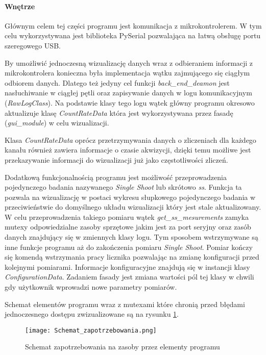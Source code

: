 \paragraph{Wnętrze}

Głównym celem tej części programu jest komunikacja z mikrokontrolerem. 
W tym celu wykorzystywana jest biblioteka PySerial\cite{pyserial} pozwalająca na łatwą obsługę portu szeregowego USB. 

By umożliwić jednoczesną wizualizację danych wraz z odbieraniem informacji z mikrokontrolera konieczna była implementacja wątku zajmującego się ciągłym odbiorem danych. 
Dlatego też jedyny cel funkcji \textit{back\_end\_deamon} jest nasłuchiwanie w ciągłej pętli oraz zapisywanie danych w logu komunikacyjnym (\textit{RawLogClass}). 
Na podstawie klasy tego logu wątek główny programu okresowo aktualizuje klasę \textit{CountRateData} która jest wykorzystywana przez fasadę (\textit{gui\_module}) w celu wizualizacji. 

Klasa \textit{CountRateData} oprócz przetrzymywania danych o zliczeniach dla każdego kanału również zawiera informacje o czasie akwizycji, dzięki temu możliwe jest przekazywanie informacji do wizualizacji już jako częstotliwości zliczeń. 

Dodatkową funkcjonalnością programu jest możliwość przeprowadzenia pojedynczego badania nazywanego \textit{Single Shoot} lub skrótowo \textit{ss}.
Funkcja ta pozwala na wizualizację w postaci wykresu słupkowego pojedynczego badania w przeciwieństwie do domyślnego układu wizualizacji który jest stale aktualizowany. 
W celu przeprowadzenia takiego pomiaru wątek \textit{get\_ss\_mesurements} zamyka mutexy odpowiedzialne zasoby sprzętowe jakim jest za port seryjny oraz zasób danych znajdujący się w zmiennych klasy logu. 
Tym sposobem wstrzymywane są inne funkcje programu aż do zakończenia pomiaru \textit{Single Shoot}.
Pomiar kończy się komendą wstrzymania pracy licznika pozwalając na zmianę konfiguracji przed kolejnymi pomiarami. Informacje konfiguracyjne znajdują się w instancji klasy \textit{ConfigurationData}. Zadaniem fasady jest zmiana wartości pól tej klasy w chwili gdy użytkownik wprowadzi nowe parametry pomiarów. 

Schemat elementów programu wraz z mutexami które chronią przed błędami jednoczesnego dostępu zwizualizowane są na rysunku \ref{program zapotrzebowanie}.
\begin{figure}
        \centering
        \texttt{[image: Schemat\_zapotrzebowania.png]}
        \caption{Schemat zapotrzebowania na zasoby przez elementy programu}
        \label{program zapotrzebowanie}
\end{figure}


